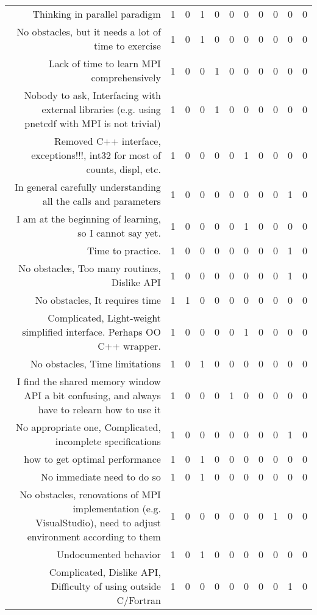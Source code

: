 {\begin{landscape}
\begin{longtable}[htb]{r|c|c|c|c|c|c|c|c|c|c}
{Thinking in parallel paradigm} & 1 & 0 & 1 & 0 & 0 & 0 & 0 & 0 & 0 & 0 \\%
{No obstacles, but it needs a lot of time to exercise} & 1 & 0 & 1 & 0 & 0 & 0 & 0 & 0 & 0 & 0 \\%
{Lack of time to learn MPI comprehensively} & 1 & 0 & 0 & 1 & 0 & 0 & 0 & 0 & 0 & 0 \\%
{Nobody to ask, Interfacing with external libraries (e.g. using pnetcdf with MPI is not trivial)} & 1 & 0 & 0 & 1 & 0 & 0 & 0 & 0 & 0 & 0 \\%
{Removed C++ interface, exceptions!!!, int32 for most of counts, displ, etc.} & 1 & 0 & 0 & 0 & 0 & 1 & 0 & 0 & 0 & 0 \\%
{In general carefully understanding all the calls and parameters} & 1 & 0 & 0 & 0 & 0 & 0 & 0 & 0 & 1 & 0 \\%
{I am at the beginning of learning, so I cannot say yet.} & 1 & 0 & 0 & 0 & 0 & 1 & 0 & 0 & 0 & 0 \\%
{Time to practice.} & 1 & 0 & 0 & 0 & 0 & 0 & 0 & 0 & 1 & 0 \\%
{No obstacles, Too many routines, Dislike API} & 1 & 0 & 0 & 0 & 0 & 0 & 0 & 0 & 1 & 0 \\%
{No obstacles, It requires time} & 1 & 1 & 0 & 0 & 0 & 0 & 0 & 0 & 0 & 0 \\%
{Complicated, Light-weight simplified interface. Perhaps OO C++ wrapper.} & 1 & 0 & 0 & 0 & 0 & 1 & 0 & 0 & 0 & 0 \\%
{No obstacles, Time limitations} & 1 & 0 & 1 & 0 & 0 & 0 & 0 & 0 & 0 & 0 \\%
{I find the shared memory window API a bit confusing, and always have to relearn how to use it} & 1 & 0 & 0 & 0 & 1 & 0 & 0 & 0 & 0 & 0 \\%
{No appropriate one, Complicated, incomplete specifications} & 1 & 0 & 0 & 0 & 0 & 0 & 0 & 0 & 1 & 0 \\%
{how to get optimal performance} & 1 & 0 & 1 & 0 & 0 & 0 & 0 & 0 & 0 & 0 \\%
{No immediate need to do so} & 1 & 0 & 1 & 0 & 0 & 0 & 0 & 0 & 0 & 0 \\%
{No obstacles, renovations of MPI implementation (e.g. VisualStudio), need to adjust environment according to them} & 1 & 0 & 0 & 0 & 0 & 0 & 0 & 1 & 0 & 0 \\%
{Undocumented behavior} & 1 & 0 & 1 & 0 & 0 & 0 & 0 & 0 & 0 & 0 \\%
{Complicated, Dislike API, Difficulty of using outside C/Fortran} & 1 & 0 & 0 & 0 & 0 & 0 & 0 & 0 & 1 & 0 \\%

\end{longtable}
\end{landscape}}

